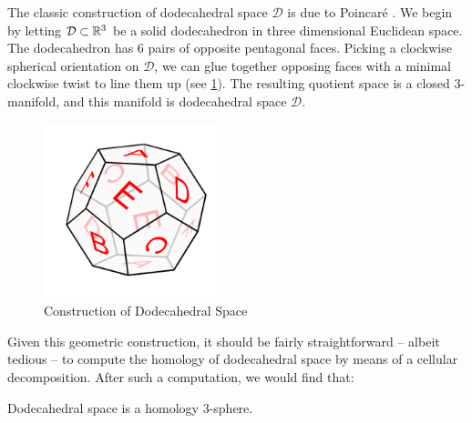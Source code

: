 The classic construction of dodecahedral space $\mathscr{D}$ is due to Poincar\'e . We begin by letting $\mathcal{D}\subset \mathbb{R}^3$ be a solid dodecahedron in three dimensional Euclidean space. The dodecahedron has 6 pairs of opposite pentagonal faces. Picking a clockwise spherical orientation on $\mathcal{D}$, we can glue together opposing faces with a minimal clockwise twist to line them up (see \cref{fig:dodecahedral_space_construction}). The resulting quotient space is a closed $3$-manifold, and this manifold is dodecahedral space $\mathscr{D}$.

\begin{figure}[ht]
	\centering
	\includegraphics[width=2in]{graphics/temp-diagrams/dodecahedral-space-geometric-construction.png}
	\caption{Construction of Dodecahedral Space}\label{fig:dodecahedral_space_construction}
\end{figure}

Given this geometric construction, it should be fairly straightforward -- albeit tedious -- to compute the homology of dodecahedral space by means of a cellular decomposition. After such a computation, we would find that:
\begin{proposition}
	Dodecahedral space is a homology $3$-sphere.
\end{proposition}

